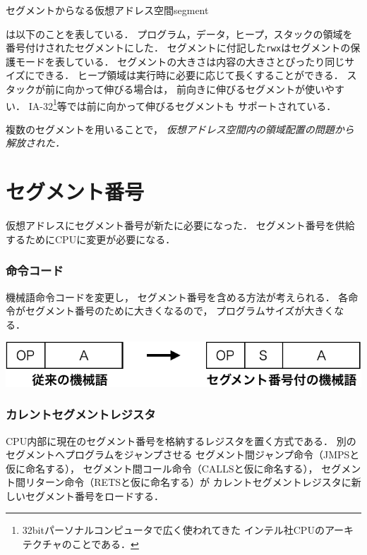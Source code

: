 {セグメントからなる仮想アドレス空間}{segment}

は以下のことを表している．
プログラム，データ，ヒープ，スタックの領域を番号付けされたセグメントにした．
セグメントに付記した\texttt{rwx}はセグメントの保護モードを表している．
セグメントの大きさは内容の大きさとぴったり同じサイズにできる．
ヒープ領域は実行時に必要に応じて長くすることができる．
スタックが前に向かって伸びる場合は，
前向きに伸びるセグメントが使いやすい．
IA-32\footnote{
32bitパーソナルコンピュータで広く使われてきた
インテル社CPUのアーキテクチャのことである．
}等では前に向かって伸びるセグメントも
サポートされている\cite{ia32Segmentation}．

複数のセグメントを用いることで，
\emph{仮想アドレス空間内の領域配置の問題から解放された．}

\section{セグメント番号}
仮想アドレスにセグメント番号が新たに必要になった．
セグメント番号を供給するためにCPUに変更が必要になる．

\subsubsection{命令コード}
機械語命令コードを変更し，
セグメント番号を含める方法が考えられる．
各命令がセグメント番号のために大きくなるので，
プログラムサイズが大きくなる．

\begin{center}
\includegraphics[scale=0.7]{Fig/segmentationInstruction-crop.pdf}
\end{center}
\subsubsection{カレントセグメントレジスタ}
CPU内部に現在のセグメント番号を格納するレジスタを置く方式である．
別のセグメントへプログラムをジャンプさせる
セグメント間ジャンプ命令（JMPSと仮に命名する），
セグメント間コール命令（CALLSと仮に命名する），
セグメント間リターン命令（RETSと仮に命名する）が
カレントセグメントレジスタに新しいセグメント番号をロードする．

